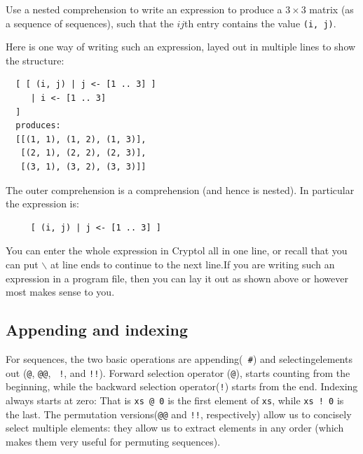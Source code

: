 \begin{Exercise}\label{ex:seq:6}
  Use a nested comprehension to write an expression to produce a
  $3\times3$ matrix (as a sequence of sequences), such that the $ij$th
  entry contains the value {\tt (i, j)}.
\end{Exercise}
\begin{Answer}
  Here is one way of writing such an expression, layed out in multiple
  lines to show the structure:
\begin{Verbatim}
  [ [ (i, j) | j <- [1 .. 3] ]
     | i <- [1 .. 3]
  ]
  produces:
  [[(1, 1), (1, 2), (1, 3)], 
   [(2, 1), (2, 2), (2, 3)],
   [(3, 1), (3, 2), (3, 3)]]
\end{Verbatim}
The outer comprehension is a comprehension (and hence is nested). In
particular the expression is:
\begin{Verbatim}
     [ (i, j) | j <- [1 .. 3] ]
\end{Verbatim}
You can enter the whole expression in Cryptol all in one line, or
recall that you can put {\tt $\backslash$} at line ends to continue to
the next line.\indLineCont If you are writing such an expression in a
program file, then you can lay it out as shown above or however most
makes sense to you.
\end{Answer}

\subsection{Appending and indexing}
\label{sec:appending-indexing}

For sequences, the two basic operations are appending\indAppend ({\tt
  \#}) and selecting\indIndex elements out ({\tt @}, {\tt @@}, {\tt
  !}, and {\tt !!}).  Forward selection operator ({\tt @}), starts
counting from the beginning, while the backward selection
operator\indRIndex ({\tt !}) starts from the end.  Indexing always
starts at zero: That is {\tt xs @ 0} is the first element of {\tt xs},
while {\tt xs ! 0} is the last.  The permutation\indIndexs
versions\indRIndexs ({\tt @@} and {\tt !!}, respectively) allow us to
concisely select multiple elements: they allow us to extract elements
in any order (which makes them very useful for permuting sequences).


